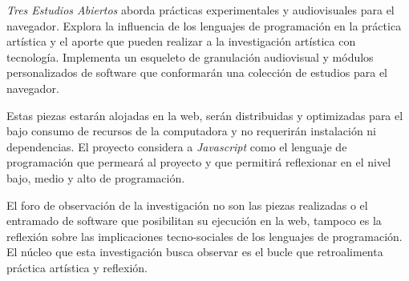 
\textit{Tres Estudios Abiertos} aborda prácticas experimentales y audiovisuales para el navegador. Explora la influencia de los lenguajes de programación en la práctica artística y el aporte que pueden realizar a la investigación artística con tecnología. Implementa un esqueleto de granulación audiovisual y módulos personalizados de software que conformarán una colección de estudios para el navegador. 


Estas piezas estarán alojadas en la web, serán distribuidas y optimizadas para el bajo consumo de recursos de la computadora y no requerirán instalación ni dependencias. El proyecto considera a \textit{Javascript} como el lenguaje de programación que permeará al proyecto y que permitirá reflexionar en el nivel bajo, medio y alto de programación. %

El foro de observación de la investigación no son las piezas realizadas o el entramado de software que posibilitan su ejecución en la web, tampoco es la reflexión sobre las implicaciones tecno-sociales de los lenguajes de programación. El núcleo que esta investigación busca observar es el bucle que retroalimenta práctica artística y reflexión. %
